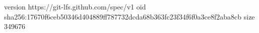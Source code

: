 version https://git-lfs.github.com/spec/v1
oid sha256:17670f6ceb50346d404889ff787732dcda68b363fc23f34f6f0a3ce8f2aba8cb
size 349676
